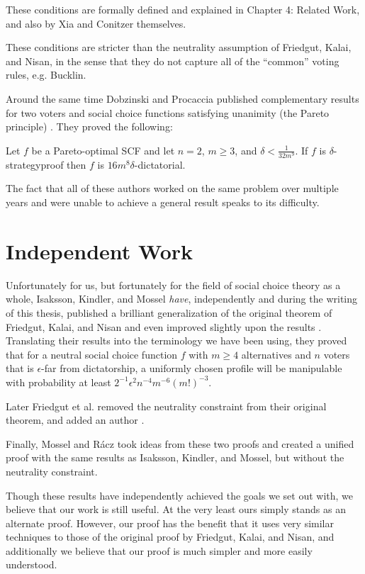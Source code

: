 	These conditions are formally defined and explained in Chapter 4: Related Work, and also by Xia and Conitzer themselves.

	These conditions are stricter than the neutrality assumption of Friedgut, Kalai, and Nisan, in the sense that they do not capture all of the ``common'' voting rules, e.g. Bucklin.

	Around the same time Dobzinski and Procaccia published complementary results for two voters and social choice functions satisfying unanimity (the Pareto principle) \cite{dobzinski2008frequent}. They proved the following:

	\begin{theorem}
		Let $f$ be a Pareto-optimal SCF and let $n = 2$, $m \ge 3$, and $\delta < \frac{1}{32m^9}$. If $f$ is $\delta$-strategyproof then $f$ is $16m^8 \delta$-dictatorial.
	\end{theorem}

	The fact that all of these authors worked on the same problem over multiple years and were unable to achieve a general result speaks to its difficulty.


\section{Independent Work}

	Unfortunately for us, but fortunately for the field of social choice theory as a whole, Isaksson, Kindler, and Mossel \emph{have}, independently and during the writing of this thesis, published a brilliant generalization of the original theorem of Friedgut, Kalai, and Nisan and even improved slightly upon the results \cite{isaksson2010geometry}. Translating their results into the terminology we have been using, they proved that for a neutral social choice function $f$ with $m \ge 4$ alternatives and $n$ voters that is $\epsilon$-far from dictatorship, a uniformly chosen profile will be manipulable with probability at least $2^{-1} \epsilon^2 n^{-4} m^{-6} (m!)^{-3}$.

	Later Friedgut et al. removed the neutrality constraint from their original theorem, and added an author \cite{friedgut2011quantitative}.

	Finally, Mossel and R\'{a}cz \cite{mossel2011quantitative} took ideas from these two proofs and created a unified proof with the same results as Isaksson, Kindler, and Mossel, but without the neutrality constraint.

	Though these results have independently achieved the goals we set out with, we believe that our work is still useful. At the very least ours simply stands as an alternate proof. However, our proof has the benefit that it uses very similar techniques to those of the original proof by Friedgut, Kalai, and Nisan, and additionally we believe that our proof is much simpler and more easily understood.


